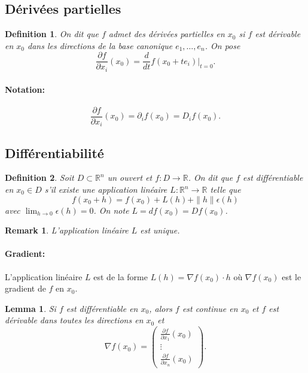 \documentclass{article}
\newtheorem{lemma}{Lemma}
\newtheorem{definition}{Definition}
\newtheorem{remark}{Remark}
\begin{document}
\subsection{Dérivées partielles}

\begin{definition}
On dit que $f$ admet des dérivées partielles en $x_0$ si $f$ est dérivable en $x_0$ dans les directions de la base canonique $e_1, \ldots, e_n$. On pose
\[
\frac{\partial f}{\partial x_i}(x_0) = \frac{d}{dt} f(x_0 + te_i) \Big|_{t=0}.
\]
\end{definition}

\paragraph{\textbf{Notation:}}
\[
\frac{\partial f}{\partial x_i}(x_0) = \partial_i f(x_0) = D_i f(x_0).
\]

\subsection{Différentiabilité}

\begin{definition}
Soit $D \subset \mathbb{R}^n$ un ouvert et $f: D \rightarrow \mathbb{R}$. On dit que $f$ est différentiable en $x_0 \in D$ s'il existe une application linéaire $L: \mathbb{R}^n \rightarrow \mathbb{R}$ telle que
\[
f(x_0 + h) = f(x_0) + L(h) + \|h\| \epsilon(h)
\]
avec $\lim_{h \rightarrow 0} \epsilon(h) = 0$.
On note $L = df(x_0) = Df(x_0)$.
\end{definition}

\begin{remark}
L'application linéaire $L$ est unique.
\end{remark}

\paragraph{\textbf{Gradient:}} L'application linéaire $L$ est de la forme $L(h) = \nabla f(x_0) \cdot h$ où $\nabla f(x_0)$ est le gradient de $f$ en $x_0$.

\begin{lemma}
Si $f$ est différentiable en $x_0$, alors $f$ est continue en $x_0$ et $f$ est dérivable dans toutes les directions en $x_0$ et
\[
\nabla f(x_0) = \begin{pmatrix}
\frac{\partial f}{\partial x_1}(x_0) \\
\vdots \\
\frac{\partial f}{\partial x_n}(x_0)
\end{pmatrix}.
\]
\end{lemma}
\end{document}
